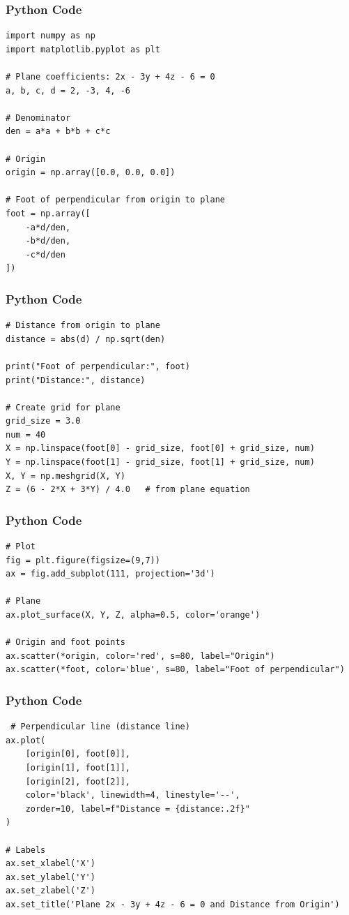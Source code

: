 \documentclass{beamer}
\begin{document}
\begin{frame}[fragile]
    \frametitle{Python Code}
    \begin{lstlisting}
import numpy as np
import matplotlib.pyplot as plt

# Plane coefficients: 2x - 3y + 4z - 6 = 0
a, b, c, d = 2, -3, 4, -6

# Denominator
den = a*a + b*b + c*c

# Origin
origin = np.array([0.0, 0.0, 0.0])

# Foot of perpendicular from origin to plane
foot = np.array([
    -a*d/den,
    -b*d/den,
    -c*d/den
])
\end{lstlisting}
\end{frame}


\begin{frame}[fragile]
    \frametitle{Python Code}
    \begin{lstlisting}
# Distance from origin to plane
distance = abs(d) / np.sqrt(den)

print("Foot of perpendicular:", foot)
print("Distance:", distance)

# Create grid for plane
grid_size = 3.0
num = 40
X = np.linspace(foot[0] - grid_size, foot[0] + grid_size, num)
Y = np.linspace(foot[1] - grid_size, foot[1] + grid_size, num)
X, Y = np.meshgrid(X, Y)
Z = (6 - 2*X + 3*Y) / 4.0   # from plane equation
\end{lstlisting}
\end{frame}


\begin{frame}[fragile]
    \frametitle{Python Code}
    \begin{lstlisting}
# Plot
fig = plt.figure(figsize=(9,7))
ax = fig.add_subplot(111, projection='3d')

# Plane
ax.plot_surface(X, Y, Z, alpha=0.5, color='orange')

# Origin and foot points
ax.scatter(*origin, color='red', s=80, label="Origin")
ax.scatter(*foot, color='blue', s=80, label="Foot of perpendicular")
\end{lstlisting}
\end{frame}


\begin{frame}[fragile]
    \frametitle{Python Code}
    \begin{lstlisting}
 # Perpendicular line (distance line)
ax.plot(
    [origin[0], foot[0]],
    [origin[1], foot[1]],
    [origin[2], foot[2]],
    color='black', linewidth=4, linestyle='--',
    zorder=10, label=f"Distance = {distance:.2f}"
)       

# Labels
ax.set_xlabel('X')
ax.set_ylabel('Y')
ax.set_zlabel('Z')
ax.set_title('Plane 2x - 3y + 4z - 6 = 0 and Distance from Origin')
\end{lstlisting}
\end{frame}
\end{document}
